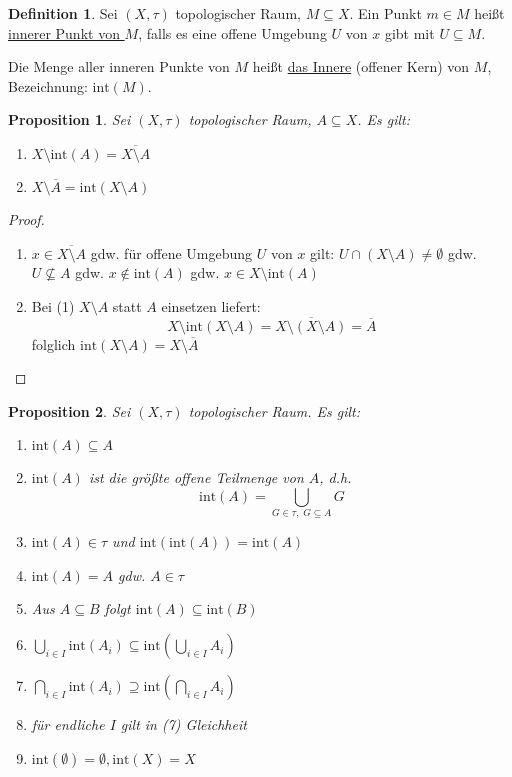 \documentclass[12pt]{scrartcl}%
\newtheorem{prop}{Proposition}
\theoremstyle{definition}
\newtheorem*{defn}{Definition}
\theoremstyle{remark}
\newcommand{\interior}{\text{int}}
\begin{document}
\begin{defn}
    Sei $(X,\tau)$ topologischer Raum, $M\subseteq X$. Ein Punkt $m\in M$ heißt \underline{innerer Punkt von $M$}, falls es eine offene Umgebung $U$ von $x$ gibt mit $U\subseteq M$.

    Die Menge aller inneren Punkte von $M$ heißt \underline{das Innere} (offener Kern) von $M$, Bezeichnung: $\interior(M)$.
\end{defn}

\begin{prop}
    Sei $(X,\tau)$ topologischer Raum, $A\subseteq X$. Es gilt:

    \begin{enumerate}[label=(\arabic*)]
        \item $X\setminus \interior(A) = \overline{X\setminus A}$
        \item $X\setminus \overline{A} = \interior(X\setminus A)$
    \end{enumerate}
\end{prop}

\begin{proof}
    \begin{enumerate}[label=(\arabic*)]
        \item $x\in \overline{X\setminus A}$ gdw. für offene Umgebung $U$ von $x$ gilt: $U\cap (X\setminus A) \neq \emptyset$ gdw. $U \not\subseteq A$ gdw. $x\not\in \interior(A)$ gdw. $x\in X\setminus \interior(A)$
        \item Bei (1) $X\setminus A$ statt $A$ einsetzen liefert: $$X\setminus \interior(X\setminus A) = \overline{X\setminus (X\setminus A)} = \overline {A}$$ folglich $\interior(X\setminus A) = X\setminus \overline{A}$
    \end{enumerate}
\end{proof}

\begin{prop}
    Sei $(X,\tau)$ topologischer Raum. Es gilt:

    \begin{enumerate}[label=(\arabic*)]
        \item $\interior(A) \subseteq A$
        \item $\interior(A)$ ist die größte offene Teilmenge von $A$, d.h. $$\interior(A) = \bigcup_{G\in\tau, \; G\subseteq A} G$$
        \item $\interior(A)\in \tau$ und $\interior(\interior(A))=\interior(A)$
        \item $\interior(A)=A$ gdw. $A\in \tau$
        \item Aus $A\subseteq B$ folgt $\interior(A)\subseteq \interior(B)$
        \item $\bigcup_{i\in I} \interior(A_i) \subseteq \interior(\bigcup_{i\in I} A_i)$
        \item $\bigcap_{i\in I} \interior(A_i) \supseteq \interior(\bigcap_{i\in I} A_i)$
        \item für endliche $I$ gilt in (7) Gleichheit
        \item $\interior(\emptyset)=\emptyset, \interior(X)=X$
    \end{enumerate}
\end{prop}
\end{document}
